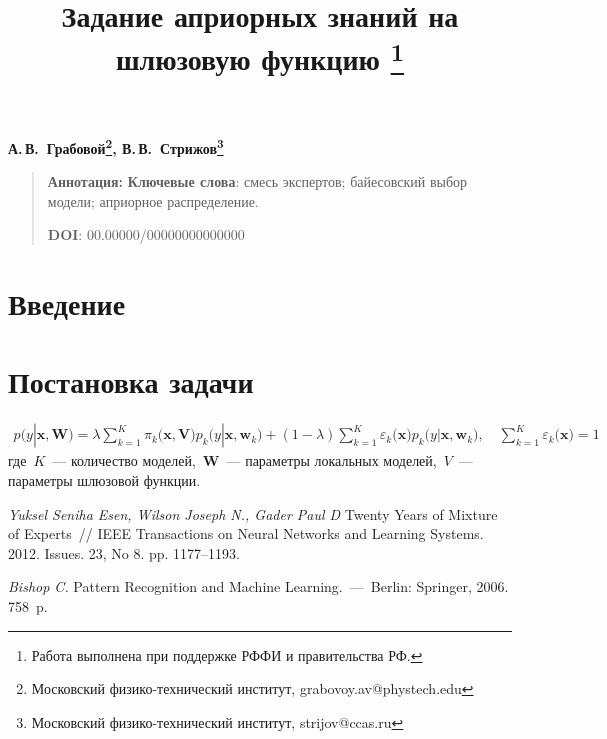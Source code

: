 \documentclass[12pt, twoside]{article}
\numberwithin{equation}{section}
\begin{document}
\title{\bf Задание априорных знаний на шлюзовую функцию \thanks{Работа выполнена при поддержке РФФИ и правительства РФ.}}
\date{}
\author{}
\maketitle

\begin{center}
\bf
А.\,В.~Грабовой\footnote{Московский физико-технический институт, grabovoy.av@phystech.edu}, В.\,В.~Стрижов\footnote{Московский физико-технический институт, strijov@ccas.ru}

\end{center}

{\centering\begin{quote}
\textbf{Аннотация:} 
\smallskip
\textbf{Ключевые слова}: смесь экспертов; байесовский выбор модели; априорное распределение.

\smallskip
\textbf{DOI}: 00.00000/00000000000000
\end{quote}
}

\section{Введение}
\section{Постановка задачи}
\[
\label{eq:st:6}
\begin{aligned}
p\bigr(y|\textbf{x}, \textbf{W}\bigr)=\lambda\sum_{k=1}^{K}\pi_{k}\bigr(\textbf{x}, \textbf{V}\bigr)p_k\bigr(y|\textbf{x}, \textbf{w}_k\bigr)+\left(1-\lambda\right)\sum_{k=1}^{K}\varepsilon_{k}\bigr(\textbf{x}\bigr)p_k\bigr(y|\textbf{x}, \textbf{w}_k\bigr), \quad \sum_{k=1}^{K}\varepsilon_k\bigr(\textbf{x}\bigr)=1
\end{aligned}
\]
где~$K$~--- количество моделей,~$\textbf{W}$~--- параметры локальных моделей,~$V$~--- параметры шлюзовой функции.

\begin{thebibliography}{99}
	\textit{Yuksel Seniha Esen, Wilson Joseph N., Gader Paul D} Twenty Years of Mixture of Experts~// IEEE Transactions on Neural Networks and Learning Systems. 2012. Issues. 23, No 8. pp. 1177--1193.
		
	\textit{Bishop C.} Pattern Recognition and Machine Learning.~---~Berlin: Springer, 2006. 758~p.
 \end{thebibliography}
\end{document}
